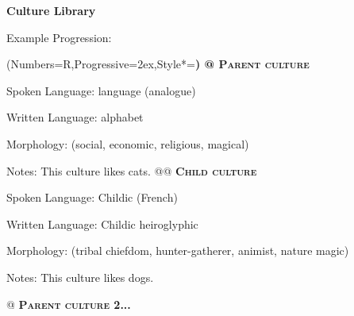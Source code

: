 \documentclass[12pt]{article}
\begin{document}
	
\Large \textbf{Culture Library}

\normalsize

\noindent\makebox[\linewidth]{\rule{0.75\paperwidth}{1pt}}

Example Progression:
\begin{easylist}
	\ListProperties(Numbers=R,Progressive=2ex,Style*=\bf)
	@ \textsc{\textbf{ Parent culture}}
	
	\normalfont Spoken Language: language (analogue)
	
	Written Language: alphabet
	
	Morphology: (social, economic, religious, magical)
	
	Notes: This culture likes cats.
	@@ \textsc{\textbf{ Child culture}}
		
	\normalfont Spoken Language: Childic (French)
	
	Written Language: Childic heiroglyphic
	
	Morphology: (tribal chiefdom, hunter-gatherer, animist, nature magic)
	
	Notes: This culture likes dogs.
	
	@ \textsc{\textbf{ Parent culture 2...}}
\end{easylist}

\noindent\makebox[\linewidth]{\rule{0.75\paperwidth}{1pt}}

\vspace{1in}
\end{document}
